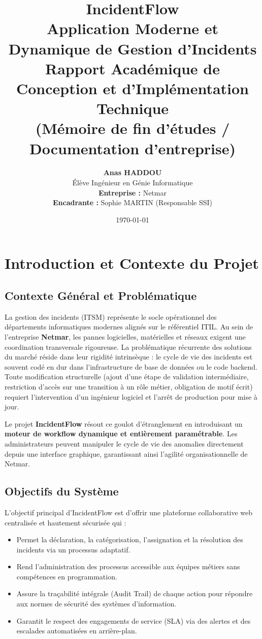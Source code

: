 \documentclass[12pt,a4paper]{article}
\title{
    \vspace{2cm}
    \textbf{\Huge IncidentFlow}\\[0.5cm]
    \Large Application Moderne et Dynamique de Gestion d'Incidents\\[1.5cm]
    \textbf{\Large Rapport Académique de Conception et d'Implémentation Technique \\ (Mémoire de fin d'études / Documentation d'entreprise)}
    \vspace{2cm}
}
\author{
    \textbf{Anas HADDOU} \\
    Élève Ingénieur en Génie Informatique \\[1cm]
    \textbf{Entreprise :} Netmar \\
    \textbf{Encadrante :} Sophie MARTIN (Responsable SSI)
}
\date{\today}
\begin{document}
\maketitle
\thispagestyle{empty}
\clearpage

\tableofcontents
\clearpage

\section{Introduction et Contexte du Projet}

\subsection{Contexte Général et Problématique}
La gestion des incidents (ITSM) représente le socle opérationnel des départements informatiques modernes alignés sur le référentiel ITIL. Au sein de l'entreprise \textbf{Netmar}, les pannes logicielles, matérielles et réseaux exigent une coordination transversale rigoureuse. La problématique récurrente des solutions du marché réside dans leur rigidité intrinsèque : le cycle de vie des incidents est souvent codé en dur dans l'infrastructure de base de données ou le code backend. Toute modification structurelle (ajout d'une étape de validation intermédiaire, restriction d'accès sur une transition à un rôle métier, obligation de motif écrit) requiert l'intervention d'un ingénieur logiciel et l'arrêt de production pour mise à jour.

Le projet \textbf{IncidentFlow} résout ce goulot d'étranglement en introduisant un \textbf{moteur de workflow dynamique et entièrement paramétrable}. Les administrateurs peuvent manipuler le cycle de vie des anomalies directement depuis une interface graphique, garantissant ainsi l'agilité organisationnelle de Netmar.

\subsection{Objectifs du Système}
L'objectif principal d'IncidentFlow est d'offrir une plateforme collaborative web centralisée et hautement sécurisée qui :
\begin{itemize}
    \item Permet la déclaration, la catégorisation, l'assignation et la résolution des incidents via un processus adaptatif.
    \item Rend l'administration des processus accessible aux équipes métiers sans compétences en programmation.
    \item Assure la traçabilité intégrale (Audit Trail) de chaque action pour répondre aux normes de sécurité des systèmes d'information.
    \item Garantit le respect des engagements de service (SLA) via des alertes et des escalades automatisées en arrière-plan.
\end{itemize}
\end{document}
